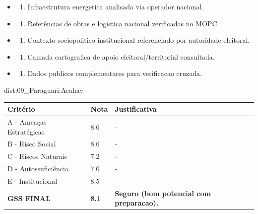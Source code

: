 {\begin{itemize}
\item
  \begin{enumerate}
  \def\labelenumi{\arabic{enumi})}
  \setcounter{enumi}{7}
  \tightlist
  \item
    Infraestrutura energetica analisada via operador nacional.
  \end{enumerate}
\item
  \begin{enumerate}
  \def\labelenumi{\arabic{enumi})}
  \setcounter{enumi}{8}
  \tightlist
  \item
    Referências de obras e logistica nacional verificadas no MOPC.
  \end{enumerate}
\item
  \begin{enumerate}
  \def\labelenumi{\arabic{enumi})}
  \setcounter{enumi}{9}
  \tightlist
  \item
    Contexto sociopolitico institucional referenciado por autoridade
    eleitoral.
  \end{enumerate}
\item
  \begin{enumerate}
  \def\labelenumi{\arabic{enumi})}
  \setcounter{enumi}{10}
  \tightlist
  \item
    Camada cartografica de apoio eleitoral/\allowbreak territorial consultada.
  \end{enumerate}
\item
  \begin{enumerate}
  \def\labelenumi{\arabic{enumi})}
  \setcounter{enumi}{11}
  \tightlist
  \item
    Dados publicos complementares para verificacao cruzada.
  \end{enumerate}
\end{itemize}}{dist:09_Paraguari:Acahay}
\begin{table}[ht!]
\small \begin{tabular}{p{3.0cm}p{0.8cm}p{6.0cm}} \toprule
\textbf{Critério} & \textbf{Nota} & \textbf{Justificativa} \\ \midrule
A - Ameaças Estratégicas & 8.6 & - \\
B - Risco Social & 8.6 & - \\
C - Riscos Naturais & 7.2 & - \\
D - Autossuficiência & 7.0 & - \\
E - Institucional & 8.5 & - \\
\midrule \textbf{GSS FINAL} & \textbf{8.1} & \textbf{Seguro (bom potencial com preparacao).} \\ \bottomrule \end{tabular}
\end{table}
